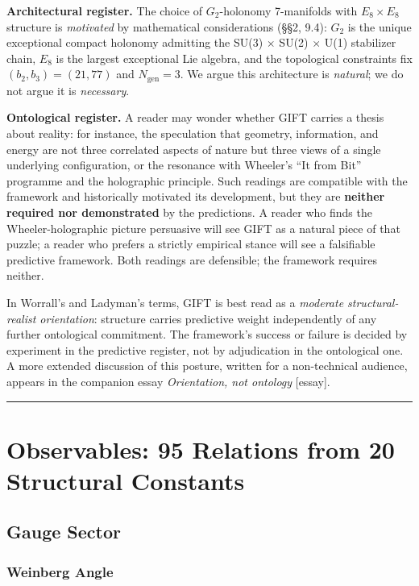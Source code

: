 \documentclass[11pt,a4paper]{article}
\begin{document}
\textbf{Architectural register.} The choice of \(G_{2}\)-holonomy
7-manifolds with \(E_8 \times E_8\) structure is \emph{motivated} by
mathematical considerations (§§2, 9.4): \(G_{2}\) is the unique
exceptional compact holonomy admitting the SU(3) \(\times\) SU(2)
\(\times\) U(1) stabilizer chain, \(E_8\) is the largest exceptional Lie
algebra, and the topological constraints fix \((b_2, b_3) = (21, 77)\)
and \(N_{\mathrm{gen}} = 3\). We argue this architecture is
\emph{natural}; we do not argue it is \emph{necessary}.

\textbf{Ontological register.} A reader may wonder whether GIFT carries
a thesis about reality: for instance, the speculation that geometry,
information, and energy are not three correlated aspects of nature but
three views of a single underlying configuration, or the resonance with
Wheeler's ``It from Bit'' programme \cite{39} and the holographic
principle. Such readings are compatible with the framework and
historically motivated its development, but they are \textbf{neither
required nor demonstrated} by the predictions. A reader who finds the
Wheeler-holographic picture persuasive will see GIFT as a natural piece
of that puzzle; a reader who prefers a strictly empirical stance will
see a falsifiable predictive framework. Both readings are defensible;
the framework requires neither.

In Worrall's \cite{40} and Ladyman's \cite{41} terms, GIFT is best read as
a \emph{moderate structural-realist orientation}: structure carries
predictive weight independently of any further ontological commitment.
The framework's success or failure is decided by experiment in the
predictive register, not by adjudication in the ontological one. A more
extended discussion of this posture, written for a non-technical
audience, appears in the companion essay \emph{Orientation, not
ontology} [essay].

\noindent

\rule{\textwidth}{0.2pt}

\section{Observables: 95 Relations from 20 Structural Constants}

\subsection{Gauge Sector}

\subsubsection{Weinberg Angle}
\end{document}
